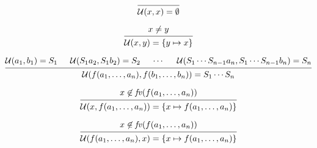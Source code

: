 \documentclass[12pt]{article}
\begin{document}
\pagestyle{empty}

\[
    \begin{prooftree}
        \infer0{\mathcal{U}(x, x) = \emptyset}
    \end{prooftree}
\]

\[
    \begin{prooftree}
        \hypo{x \neq y}
        \infer1{\mathcal{U}(x, y) = \{y \mapsto x\}}
    \end{prooftree}
\]

\[
    \begin{prooftree}
        \hypo{\mathcal{U}(a_1, b_1) = S_1}
        \hypo{\mathcal{U}(S_1a_2, S_1b_2) = S_2}
        \hypo{\cdots}
        \hypo{\mathcal{U}(S_1 \cdots S_{n - 1}a_n, S_1 \cdots S_{n - 1}b_n) = S_n}
        \infer4{\mathcal{U}(f(a_1, \ldots, a_n), f(b_1, \ldots, b_n)) = S_1 \cdots S_n}
    \end{prooftree}
\]

\[
    \begin{prooftree}
        \hypo{x \not\in \mathit{fv}(f(a_1, \ldots, a_n))}
        \infer1{\mathcal{U}(x, f(a_1, \ldots, a_n)) = \{x \mapsto f(a_1, \ldots, a_n)\}}
    \end{prooftree}
\]

\[
    \begin{prooftree}
        \hypo{x \not\in \mathit{fv}(f(a_1, \ldots, a_n))}
        \infer1{\mathcal{U}(f(a_1, \ldots, a_n), x) = \{x \mapsto f(a_1, \ldots, a_n)\}}
    \end{prooftree}
\]
\end{document}

